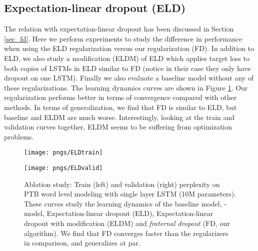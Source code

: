 \documentclass{article} \usepackage{iclr2018_conference,times}
\begin{document}
\subsection{Expectation-linear dropout (ELD)}\label{subsec:eld}

The relation with expectation-linear dropout \cite{ma2016dropout} has been discussed in Section \ref{sec_fd}. Here we perform experiments to study the difference in performance when using the ELD regularization versus our regularization (FD). In addition to ELD, we also study a modification (ELDM) of ELD which applies target loss to both copies of LSTMs in ELD similar to FD (notice in their case they only have dropout on one LSTM). Finally we also evaluate a baseline model without any of these regularizations. The learning dynamics curves are shown in Figure \ref{fig_pi_model}. Our regularization performs better in terms of convergence compared with other methods. In terms of generalization, we find that FD is similar to ELD, but baseline and ELDM are much worse. Interestingly, looking at the train and validation curves together, ELDM seems to be suffering from optimization problems.

\begin{figure}[t]
\vspace{-0.08cm}
  \centering
  \begin{minipage}[b]{0.48\textwidth}
    \texttt{[image: pngs/ELDtrain]}
  \end{minipage}
  \hfill
  \begin{minipage}[b]{0.48\textwidth}
    \texttt{[image: pngs/ELDvalid]}
  \end{minipage}
  \caption{Ablation study: Train (left) and validation (right) perplexity on PTB word level modeling with single layer LSTM (10M parameters). These curves study the learning dynamics of the baseline model, -model, Expectation-linear dropout (ELD), Expectation-linear dropout with modification (ELDM) and \emph{fraternal dropout} (FD, our algorithm). We find that FD converges faster than the regularizers in comparison, and generalizes at par.}
\vspace{-0.08cm}
\label{fig_pi_model}
\end{figure}
\end{document}
